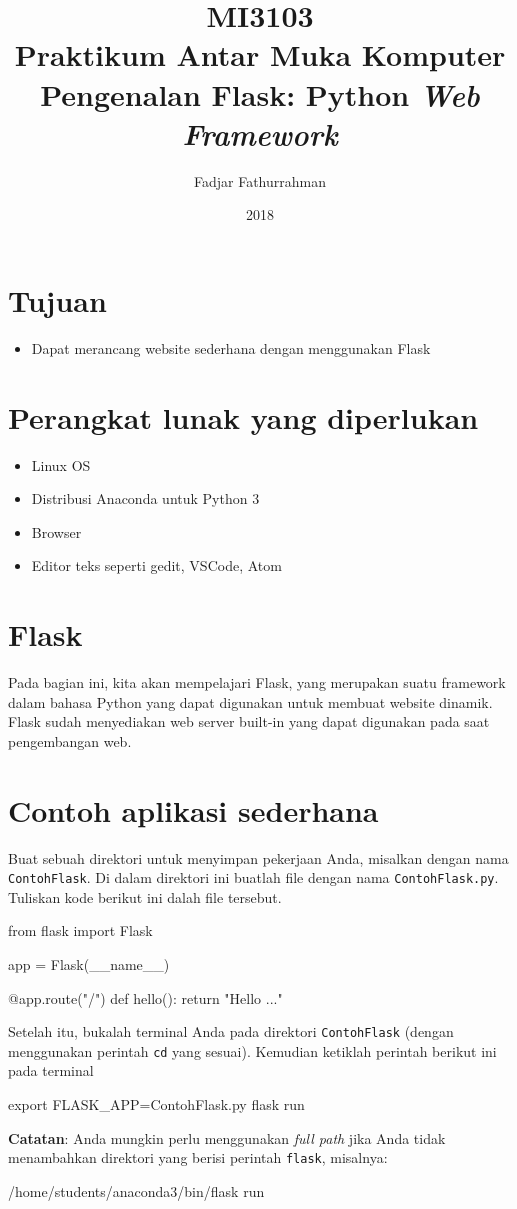 \documentclass[a4paper,11pt]{extarticle}
\title{
MI3103 \\
Praktikum Antar Muka Komputer\\
Pengenalan Flask: Python \textit{Web Framework}}
\author{Fadjar Fathurrahman}
\date{2018}
\begin{document}
\maketitle

\section{Tujuan}
\begin{itemize}
\item Dapat merancang website sederhana dengan menggunakan Flask
\end{itemize}

\section{Perangkat lunak yang diperlukan}
\begin{itemize}
\item Linux OS
\item Distribusi Anaconda untuk Python 3
\item Browser
\item Editor teks seperti \textsf{gedit}, \textsf{VSCode}, \textsf{Atom}
\end{itemize}

\section{Flask}
Pada bagian ini, kita akan mempelajari Flask, yang merupakan suatu framework
dalam bahasa Python yang dapat digunakan untuk membuat website dinamik.
Flask sudah menyediakan web server built-in yang dapat digunakan pada
saat pengembangan web.

\section{Contoh aplikasi sederhana}
Buat sebuah direktori untuk menyimpan pekerjaan Anda, misalkan dengan
nama \texttt{ContohFlask}. Di dalam direktori ini buatlah file dengan
nama \texttt{ContohFlask.py}. Tuliskan kode berikut ini dalah
file tersebut.

\begin{pythoncode}
from flask import Flask

app = Flask(__name__)

@app.route("/")
def hello():
    return "Hello ..."
\end{pythoncode}

Setelah itu, bukalah terminal Anda pada direktori \texttt{ContohFlask} (dengan menggunakan
perintah \texttt{cd} yang sesuai).
Kemudian ketiklah perintah berikut ini pada terminal
\begin{textcode}
export FLASK_APP=ContohFlask.py
flask run
\end{textcode}
\textbf{Catatan}: Anda mungkin perlu menggunakan \textit{full path} jika Anda
tidak menambahkan direktori yang berisi perintah \texttt{flask}, misalnya:
\begin{textcode}
/home/students/anaconda3/bin/flask run
\end{textcode}
\end{document}

